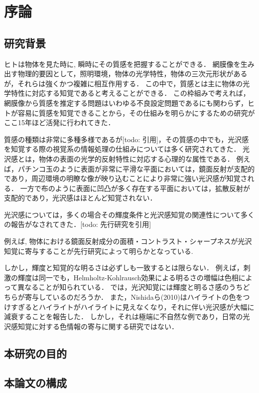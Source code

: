 \chapter{序論}
    \section{研究背景}

    ヒトは物体を見た時に, 瞬時にその質感を把握することができる．
    網膜像を生み出す物理的要因として，照明環境，物体の光学特性，物体の三次元形状があるが，それらは強くかつ複雑に相互作用する．
    この中で，質感とは主に物体の光学特性に対応する知覚であると考えることができる．
    この枠組みで考えれば，網膜像から質感を推定する問題はいわゆる不良設定問題であるにも関わらず，ヒトが容易に質感を知覚できることから，その仕組みを明らかにするための研究がここ15年ほど活発に行われてきた．

    質感の種類は非常に多種多様であるが[todo: 引用]，その質感の中でも，光沢感を知覚する際の視覚系の情報処理の仕組みについては多く研究されてきた．
    光沢感とは，物体の表面の光学的反射特性に対応する心理的な属性である．
    例えば，パチンコ玉のように表面が非常に平滑な平面においては，鏡面反射が支配的であり，周辺環境の明瞭な像が映り込むことにより非常に強い光沢感が知覚される．
    一方で布のように表面に凹凸が多く存在する平面においては，拡散反射が支配的であり，光沢感はほとんど知覚されない．

    光沢感については，多くの場合その輝度条件と光沢感知覚の関連性について多くの報告がなされてきた．[todo: 先行研究を引用]

    例えば, 物体における鏡面反射成分の面積・コントラスト・シャープネスが光沢知覚に寄与することが先行研究によって明らかとなっている.


    
    しかし，輝度と知覚的な明るさは必ずしも一致するとは限らない．
    例えば，刺激の輝度は同一でも，Helmholtz-Kohlrausch効果による明るさの増幅は色相によって異なることが知られている．
    では，光沢知覚には輝度と明るさ感のうちどちらが寄与しているのだろうか．
    また，Nishidaら(2010)はハイライトの色をつけすぎるとハイライトがハイライトに見えなくなり，それに伴い光沢感が大幅に減衰することを報告した．
    しかし，それは極端に不自然な例であり，日常の光沢感知覚に対する色情報の寄与に関する研究ではない．


    \section{本研究の目的}
    \section{本論文の構成}
